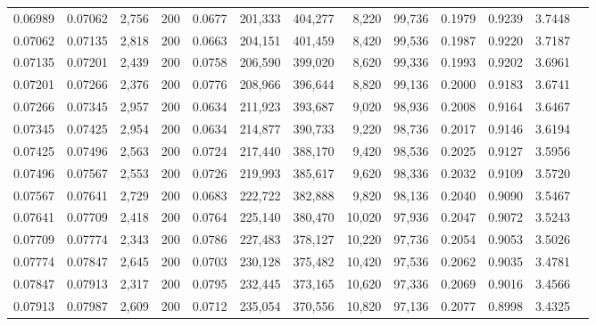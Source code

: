 \begin{tabular}{rrrrrrrrrrrrr}
0.06989 & 0.07062 &  2,756 & 200 &                                     0.0677 & 201,333 & 404,277 &   8,220 &  99,736 & 0.1979 & 0.9239 & 3.7448 \\
0.07062 & 0.07135 &  2,818 & 200 &                                     0.0663 & 204,151 & 401,459 &   8,420 &  99,536 & 0.1987 & 0.9220 & 3.7187 \\
0.07135 & 0.07201 &  2,439 & 200 &                                     0.0758 & 206,590 & 399,020 &   8,620 &  99,336 & 0.1993 & 0.9202 & 3.6961 \\
0.07201 & 0.07266 &  2,376 & 200 &                                     0.0776 & 208,966 & 396,644 &   8,820 &  99,136 & 0.2000 & 0.9183 & 3.6741 \\
0.07266 & 0.07345 &  2,957 & 200 &                                     0.0634 & 211,923 & 393,687 &   9,020 &  98,936 & 0.2008 & 0.9164 & 3.6467 \\
0.07345 & 0.07425 &  2,954 & 200 &                                     0.0634 & 214,877 & 390,733 &   9,220 &  98,736 & 0.2017 & 0.9146 & 3.6194 \\
0.07425 & 0.07496 &  2,563 & 200 &                                     0.0724 & 217,440 & 388,170 &   9,420 &  98,536 & 0.2025 & 0.9127 & 3.5956 \\
0.07496 & 0.07567 &  2,553 & 200 &                                     0.0726 & 219,993 & 385,617 &   9,620 &  98,336 & 0.2032 & 0.9109 & 3.5720 \\
0.07567 & 0.07641 &  2,729 & 200 &                                     0.0683 & 222,722 & 382,888 &   9,820 &  98,136 & 0.2040 & 0.9090 & 3.5467 \\
0.07641 & 0.07709 &  2,418 & 200 &                                     0.0764 & 225,140 & 380,470 &  10,020 &  97,936 & 0.2047 & 0.9072 & 3.5243 \\
0.07709 & 0.07774 &  2,343 & 200 &                                     0.0786 & 227,483 & 378,127 &  10,220 &  97,736 & 0.2054 & 0.9053 & 3.5026 \\
0.07774 & 0.07847 &  2,645 & 200 &                                     0.0703 & 230,128 & 375,482 &  10,420 &  97,536 & 0.2062 & 0.9035 & 3.4781 \\
0.07847 & 0.07913 &  2,317 & 200 &                                     0.0795 & 232,445 & 373,165 &  10,620 &  97,336 & 0.2069 & 0.9016 & 3.4566 \\
0.07913 & 0.07987 &  2,609 & 200 &                                     0.0712 & 235,054 & 370,556 &  10,820 &  97,136 & 0.2077 & 0.8998 & 3.4325 \\

\end{tabular}
